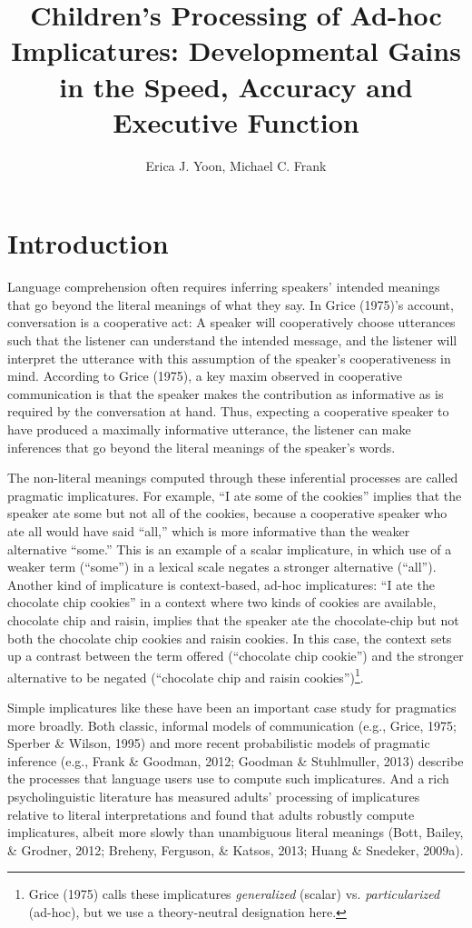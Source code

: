 \documentclass[a4paper,man,apacite,floatsintext]{apa6}
\date{}
\title{\textbf{Children's Processing of Ad-hoc Implicatures: Developmental Gains in the
Speed, Accuracy and Executive Function}}
\author{Erica J. Yoon, Michael C. Frank}
\affiliation{Department of Psychology, Stanford University}
\begin{document}
\maketitle

\section{Introduction}\label{introduction}

Language comprehension often requires inferring speakers' intended
meanings that go beyond the literal meanings of what they say. In Grice
(1975)'s account, conversation is a cooperative act: A speaker will
cooperatively choose utterances such that the listener can understand
the intended message, and the listener will interpret the utterance with
this assumption of the speaker's cooperativeness in mind. According to
Grice (1975), a key maxim observed in cooperative communication is that
the speaker makes the contribution as informative as is required by the
conversation at hand. Thus, expecting a cooperative speaker to have
produced a maximally informative utterance, the listener can make
inferences that go beyond the literal meanings of the speaker's words.

The non-literal meanings computed through these inferential processes
are called pragmatic implicatures. For example, ``I ate some of the
cookies'' implies that the speaker ate some but not all of the cookies,
because a cooperative speaker who ate all would have said ``all,'' which
is more informative than the weaker alternative ``some.'' This is an
example of a scalar implicature, in which use of a weaker term
(``some'') in a lexical scale negates a stronger alternative (``all'').
Another kind of implicature is context-based, ad-hoc implicatures: ``I
ate the chocolate chip cookies'' in a context where two kinds of cookies
are available, chocolate chip and raisin, implies that the speaker ate
the chocolate-chip but not both the chocolate chip cookies and raisin
cookies. In this case, the context sets up a contrast between the term
offered (``chocolate chip cookie'') and the stronger alternative to be
negated (``chocolate chip and raisin cookies'')\footnote{Grice (1975)
  calls these implicatures \emph{generalized} (scalar) vs.
  \emph{particularized} (ad-hoc), but we use a theory-neutral
  designation here.}.

Simple implicatures like these have been an important case study for
pragmatics more broadly. Both classic, informal models of communication
(e.g., Grice, 1975; Sperber \& Wilson, 1995) and more recent
probabilistic models of pragmatic inference (e.g., Frank \& Goodman,
2012; Goodman \& Stuhlmuller, 2013) describe the processes that language
users use to compute such implicatures. And a rich psycholinguistic
literature has measured adults' processing of implicatures relative to
literal interpretations and found that adults robustly compute
implicatures, albeit more slowly than unambiguous literal meanings
(Bott, Bailey, \& Grodner, 2012; Breheny, Ferguson, \& Katsos, 2013;
Huang \& Snedeker, 2009a).
\end{document}
